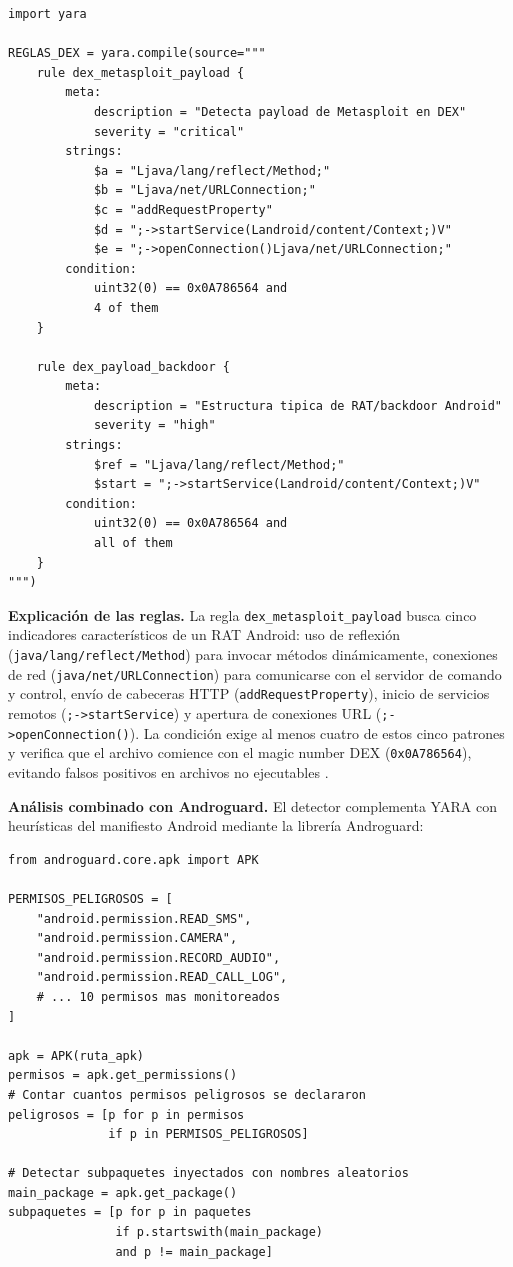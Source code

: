\documentclass[12pt,a4paper]{article}
\begin{document}
\begin{lstlisting}[caption={Reglas YARA para detección de payload Metasploit en DEX de APK},
                   label=lst:yara_dex]
import yara

REGLAS_DEX = yara.compile(source="""
    rule dex_metasploit_payload {
        meta:
            description = "Detecta payload de Metasploit en DEX"
            severity = "critical"
        strings:
            $a = "Ljava/lang/reflect/Method;"
            $b = "Ljava/net/URLConnection;"
            $c = "addRequestProperty"
            $d = ";->startService(Landroid/content/Context;)V"
            $e = ";->openConnection()Ljava/net/URLConnection;"
        condition:
            uint32(0) == 0x0A786564 and
            4 of them
    }

    rule dex_payload_backdoor {
        meta:
            description = "Estructura tipica de RAT/backdoor Android"
            severity = "high"
        strings:
            $ref = "Ljava/lang/reflect/Method;"
            $start = ";->startService(Landroid/content/Context;)V"
        condition:
            uint32(0) == 0x0A786564 and
            all of them
    }
""")
\end{lstlisting}

\textbf{Explicación de las reglas.} La regla
\texttt{dex\_metasploit\_payload} busca cinco indicadores
característicos de un RAT Android: uso de reflexión
(\texttt{java/lang/reflect/Method}) para invocar métodos dinámicamente,
conexiones de red (\texttt{java/net/URLConnection}) para comunicarse con
el servidor de comando y control, envío de cabeceras HTTP
(\texttt{addRequestProperty}), inicio de servicios remotos
(\texttt{;->startService}) y apertura de conexiones URL
(\texttt{;->openConnection()}). La condición exige al menos cuatro de
estos cinco patrones y verifica que el archivo comience con el magic
number DEX (\texttt{0x0A786564}), evitando falsos positivos en archivos
no ejecutables \cite{huacac2026}.

\textbf{Análisis combinado con Androguard.} El detector complementa
YARA con heurísticas del manifiesto Android mediante la librería
Androguard:

\begin{lstlisting}[caption={Análisis heurístico del AndroidManifest con Androguard},
                   label=lst:androguard]
from androguard.core.apk import APK

PERMISOS_PELIGROSOS = [
    "android.permission.READ_SMS",
    "android.permission.CAMERA",
    "android.permission.RECORD_AUDIO",
    "android.permission.READ_CALL_LOG",
    # ... 10 permisos mas monitoreados
]

apk = APK(ruta_apk)
permisos = apk.get_permissions()
# Contar cuantos permisos peligrosos se declararon
peligrosos = [p for p in permisos
              if p in PERMISOS_PELIGROSOS]

# Detectar subpaquetes inyectados con nombres aleatorios
main_package = apk.get_package()
subpaquetes = [p for p in paquetes
               if p.startswith(main_package)
               and p != main_package]
\end{lstlisting}
\end{document}
